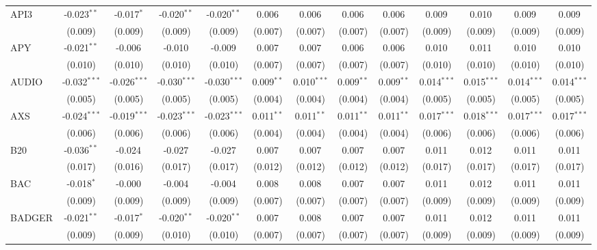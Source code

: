 \begin{table}[!htbp]
\begin{tabular}{@{\extracolsep{5pt}}lcccccccccccc}
 API3 & -0.023$^{**}$ & -0.017$^{*}$ & -0.020$^{**}$ & -0.020$^{**}$ & 0.006$^{}$ & 0.006$^{}$ & 0.006$^{}$ & 0.006$^{}$ & 0.009$^{}$ & 0.010$^{}$ & 0.009$^{}$ & 0.009$^{}$ \\
  & (0.009) & (0.009) & (0.009) & (0.009) & (0.007) & (0.007) & (0.007) & (0.007) & (0.009) & (0.009) & (0.009) & (0.009) \\
 APY & -0.021$^{**}$ & -0.006$^{}$ & -0.010$^{}$ & -0.009$^{}$ & 0.007$^{}$ & 0.007$^{}$ & 0.006$^{}$ & 0.006$^{}$ & 0.010$^{}$ & 0.011$^{}$ & 0.010$^{}$ & 0.010$^{}$ \\
  & (0.010) & (0.010) & (0.010) & (0.010) & (0.007) & (0.007) & (0.007) & (0.007) & (0.010) & (0.010) & (0.010) & (0.010) \\
 AUDIO & -0.032$^{***}$ & -0.026$^{***}$ & -0.030$^{***}$ & -0.030$^{***}$ & 0.009$^{**}$ & 0.010$^{***}$ & 0.009$^{**}$ & 0.009$^{**}$ & 0.014$^{***}$ & 0.015$^{***}$ & 0.014$^{***}$ & 0.014$^{***}$ \\
  & (0.005) & (0.005) & (0.005) & (0.005) & (0.004) & (0.004) & (0.004) & (0.004) & (0.005) & (0.005) & (0.005) & (0.005) \\
 AXS & -0.024$^{***}$ & -0.019$^{***}$ & -0.023$^{***}$ & -0.023$^{***}$ & 0.011$^{**}$ & 0.011$^{**}$ & 0.011$^{**}$ & 0.011$^{**}$ & 0.017$^{***}$ & 0.018$^{***}$ & 0.017$^{***}$ & 0.017$^{***}$ \\
  & (0.006) & (0.006) & (0.006) & (0.006) & (0.004) & (0.004) & (0.004) & (0.004) & (0.006) & (0.006) & (0.006) & (0.006) \\
 B20 & -0.036$^{**}$ & -0.024$^{}$ & -0.027$^{}$ & -0.027$^{}$ & 0.007$^{}$ & 0.007$^{}$ & 0.007$^{}$ & 0.007$^{}$ & 0.011$^{}$ & 0.012$^{}$ & 0.011$^{}$ & 0.011$^{}$ \\
  & (0.017) & (0.016) & (0.017) & (0.017) & (0.012) & (0.012) & (0.012) & (0.012) & (0.017) & (0.017) & (0.017) & (0.017) \\
 BAC & -0.018$^{*}$ & -0.000$^{}$ & -0.004$^{}$ & -0.004$^{}$ & 0.008$^{}$ & 0.008$^{}$ & 0.007$^{}$ & 0.007$^{}$ & 0.011$^{}$ & 0.012$^{}$ & 0.011$^{}$ & 0.011$^{}$ \\
  & (0.009) & (0.009) & (0.009) & (0.009) & (0.007) & (0.007) & (0.007) & (0.007) & (0.009) & (0.009) & (0.009) & (0.009) \\
 BADGER & -0.021$^{**}$ & -0.017$^{*}$ & -0.020$^{**}$ & -0.020$^{**}$ & 0.007$^{}$ & 0.008$^{}$ & 0.007$^{}$ & 0.007$^{}$ & 0.011$^{}$ & 0.012$^{}$ & 0.011$^{}$ & 0.011$^{}$ \\
  & (0.009) & (0.009) & (0.010) & (0.010) & (0.007) & (0.007) & (0.007) & (0.007) & (0.009) & (0.009) & (0.009) & (0.009) \\

\end{tabular}
\end{table}
